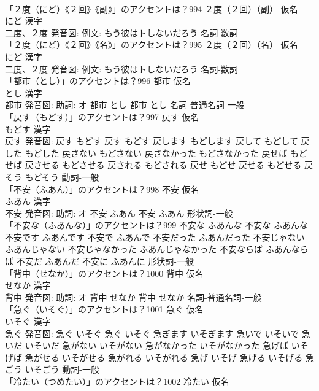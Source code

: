 \documentclass[8pt]{extreport}
\begin{document}
\begin{CJK}{UTF8}{min}
\\	「２度（にど）《２回》《副》」のアクセントは？994	２度（２回）（副） 仮名　
\\	にど 漢字　
\\	二度、２度 発音図: 例文: もう彼はトしないだろう							名詞-数詞 
\\	「２度（にど）《２回》《名》」のアクセントは？995	２度（２回）（名） 仮名　
\\	にど 漢字　
\\	二度、２度 発音図: 例文: もう彼はトしないだろう							名詞-数詞 
\\	「都市（とし）」のアクセントは？996	都市 仮名　
\\	とし 漢字　
\\	都市 発音図: 助詞: オ	都市 とし		都市 とし				名詞-普通名詞-一般 
\\	「戻す（もどす）」のアクセントは？997	戻す 仮名　
\\	もどす 漢字　
\\	戻す 発音図:	戻す もどす		戻す もどす 戻します もどします 戻して もどして 戻した もどした 戻さない もどさない 戻さなかった もどさなかった 戻せば もどせば 戻させる もどさせる 戻される もどされる 戻せ もどせ 戻せる もどせる 戻そう もどそう				動詞-一般 
\\	「不安（ふあん）」のアクセントは？998	不安 仮名　
\\	ふあん 漢字　
\\	不安 発音図: 助詞: オ	不安 ふあん		不安 ふあん				形状詞-一般 
\\	「不安な（ふあんな）」のアクセントは？999		不安な ふあんな		不安な ふあんな 不安です ふあんです 不安で ふあんで 不安だった ふあんだった 不安じゃない ふあんじゃない 不安じゃなかった ふあんじゃなかった 不安ならば ふあんならば 不安だ ふあんだ 不安に ふあんに				形状詞-一般 
\\	「背中（せなか）」のアクセントは？1000	背中 仮名　
\\	せなか 漢字　
\\	背中 発音図: 助詞: オ	背中 せなか		背中 せなか				名詞-普通名詞-一般 
\\	「急ぐ（いそぐ）」のアクセントは？1001	急ぐ 仮名　
\\	いそぐ 漢字　
\\	急ぐ 発音図:	急ぐ いそぐ		急ぐ いそぐ 急ぎます いそぎます 急いで いそいで 急いだ いそいだ 急がない いそがない 急がなかった いそがなかった 急げば いそげば 急がせる いそがせる 急がれる いそがれる 急げ いそげ 急げる いそげる 急ごう いそごう				動詞-一般 
\\	「冷たい（つめたい）」のアクセントは？1002	冷たい 仮名　

\end{CJK}
\end{document}
